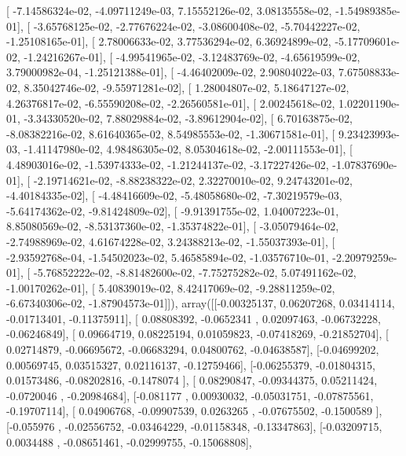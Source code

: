 \documentclass{article}
\begin{document}
       [ -7.14586324e-02,  -4.09711249e-03,   7.15552126e-02,
          3.08135558e-02,  -1.54989385e-01],
       [ -3.65768125e-02,  -2.77676224e-02,  -3.08600408e-02,
         -5.70442227e-02,  -1.25108165e-01],
       [  2.78006633e-02,   3.77536294e-02,   6.36924899e-02,
         -5.17709601e-02,  -1.24216267e-01],
       [ -4.99541965e-02,  -3.12483769e-02,  -4.65619599e-02,
          3.79000982e-04,  -1.25121388e-01],
       [ -4.46402009e-02,   2.90804022e-03,   7.67508833e-02,
          8.35042746e-02,  -9.55971281e-02],
       [  1.28004807e-02,   5.18647127e-02,   4.26376817e-02,
         -6.55590208e-02,  -2.26560581e-01],
       [  2.00245618e-02,   1.02201190e-01,  -3.34330520e-02,
          7.88029884e-02,  -3.89612904e-02],
       [  6.70163875e-02,  -8.08382216e-02,   8.61640365e-02,
          8.54985553e-02,  -1.30671581e-01],
       [  9.23423993e-03,  -1.41147980e-02,   4.98486305e-02,
          8.05304618e-02,  -2.00111553e-01],
       [  4.48903016e-02,  -1.53974333e-02,  -1.21244137e-02,
         -3.17227426e-02,  -1.07837690e-01],
       [ -2.19714621e-02,  -8.88238322e-02,   2.32270010e-02,
          9.24743201e-02,  -4.40184335e-02],
       [ -4.48416609e-02,  -5.48058680e-02,  -7.30219579e-03,
         -5.64174362e-02,  -9.81424809e-02],
       [ -9.91391755e-02,   1.04007223e-01,   8.85080569e-02,
         -8.53137360e-02,  -1.35374822e-01],
       [ -3.05079464e-02,  -2.74988969e-02,   4.61674228e-02,
          3.24388213e-02,  -1.55037393e-01],
       [ -2.93592768e-04,  -1.54502023e-02,   5.46585894e-02,
         -1.03576710e-01,  -2.20979259e-01],
       [ -5.76852222e-02,  -8.81482600e-02,  -7.75275282e-02,
          5.07491162e-02,  -1.00170262e-01],
       [  5.40839019e-02,   8.42417069e-02,  -9.28811259e-02,
         -6.67340306e-02,  -1.87904573e-01]]), array([[-0.00325137,  0.06207268,  0.03414114, -0.01713401, -0.11375911],
       [ 0.08808392, -0.0652341 ,  0.02097463, -0.06732228, -0.06246849],
       [ 0.09664719,  0.08225194,  0.01059823, -0.07418269, -0.21852704],
       [ 0.02714879, -0.06695672, -0.06683294,  0.04800762, -0.04638587],
       [-0.04699202,  0.00569745,  0.03515327,  0.02116137, -0.12759466],
       [-0.06255379, -0.01804315,  0.01573486, -0.08202816, -0.1478074 ],
       [ 0.08290847, -0.09344375,  0.05211424, -0.0720046 , -0.20984684],
       [-0.081177  ,  0.00930032, -0.05031751, -0.07875561, -0.19707114],
       [ 0.04906768, -0.09907539,  0.0263265 , -0.07675502, -0.1500589 ],
       [-0.055976  , -0.02556752, -0.03464229, -0.01158348, -0.13347863],
       [-0.03209715,  0.0034488 , -0.08651461, -0.02999755, -0.15068808],
\end{document}

